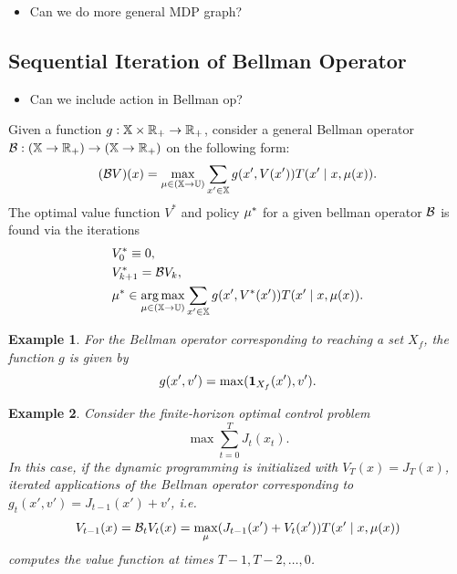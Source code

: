 \documentclass[conference]{IEEEtran}
\newtheorem{example}{Example}
\newcommand{\red}[1]{{\color{red} #1 }}
\begin{document}
\begin{itemize}
  \item \red{Can we do more general MDP graph?}
\end{itemize}

\subsection{Sequential Iteration of Bellman Operator}

\begin{itemize}
  \item \red{Can we include action in Bellman op?}
\end{itemize}

Given a function $g: \mathbb{X} \times \mathbb{R}_+ \rightarrow \mathbb{R}_+$, consider a general Bellman operator $\mathcal{B} : (\mathbb{X} \rightarrow \mathbb{R}_+) \rightarrow (\mathbb{X} \rightarrow \mathbb{R}_+)$ on the following form:
\begin{equation}
  (\mathcal{B} V) (x) = \max_{\mu \in (\mathbb{X} \rightarrow \mathbb{U})} \sum_{x' \in \mathbb{X}}  g(x', V(x')) T(x' \mid x, \mu(x)).
\end{equation}
The optimal value function $V^*$ and policy $\mu^*$ for a given bellman operator $\mathcal{B}$ is found via the iterations
\begin{subequations}
\label{eq:value_iter}
  \begin{align}
    & V^*_0 \equiv 0, \\
    & V^*_{k+1}  = \bellman V_k \label{eq:iter}, \\
    & \pol^* \in \argmax_{\pol \in (\X \rightarrow \U)} \sum_{x' \in \X}  g(x', V^*(x')) T(x' \mid x, \pol(x)).
  \end{align}
\end{subequations}

\begin{example}
  For the Bellman operator corresponding to reaching a set $X_f$, the function $g$ is given by
  \begin{equation*}
    g(x', v') = \max( \mathbf{1}_{X_f}(x'), v').
  \end{equation*}
\end{example}

\begin{example}
  Consider the finite-horizon optimal control problem 
  \begin{equation}
     \max \sum_{t=0}^T J_t(x_t).
  \end{equation} 
  In this case, if the dynamic programming is initialized with $V_T(x) = J_T(x)$, iterated applications of the Bellman operator corresponding to $g_t(x', v') = J_{t-1}(x') + v'$, i.e.
  \begin{equation*}
    V_{t-1}(x) = \mathcal{B}_t V_{t} (x) = \max_{\mu} (J_{t-1}(x') + V_{t}(x')) T(x' \mid x, \mu(x))
  \end{equation*}
  computes the value function at times $T-1, T-2, \ldots, 0$.
\end{example}
\end{document}

